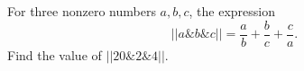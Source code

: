 For three nonzero numbers $a, b, c$, the expression \[||a \& b \& c||=\dfrac{a}{b}+\dfrac{b}{c}+\dfrac{c}{a}.\]Find the value of $||20\&2\&4||$.

